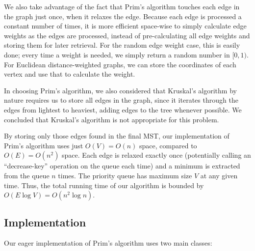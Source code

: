 \documentclass[a4paper]{article}
\begin{document}
We also take advantage of the fact that Prim's algorithm touches each edge in the graph just once, when it relaxes the edge. Because each edge is processed a constant number of times, it is more efficient space-wise to simply calculate edge weights as the edges are processed, instead of pre-calculating all edge weights and storing them for later retrieval. For the random edge weight case, this is easily done; every time a weight is needed, we simply return a random number in $[0, 1)$. For Euclidean distance-weighted graphs, we can store the coordinates of each vertex and use that to calculate the weight.

In choosing Prim's algorithm, we also considered that Kruskal's algorithm by nature requires us to store all edges in the graph, since it iterates through the edges from lightest to heaviest, adding edges to the tree whenever possible. We concluded that Kruskal's algorithm is not appropriate for this problem.

By storing only those edges found in the final MST, our implementation of Prim's algorithm uses just $O(V) = O(n)$ space, compared to $O(E) = O(n^2)$ space. Each edge is relaxed exactly once (potentially calling an ``decrease-key'' operation on the queue each time) and a minimum is extracted from the queue $n$ times. The priority queue has maximum size $V$ at any given time. Thus, the total running time of our algorithm is bounded by $O(E\log V) = O(n^2\log n)$.

\subsection{Implementation}
Our eager implementation of Prim's algorithm uses two main classes:
\end{document}
